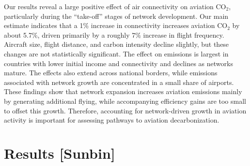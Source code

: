 \documentclass[12pt]{article}
\begin{document}
Our results reveal a large positive effect of air connectivity on
aviation CO$_2$, particularly during the ``take-off'' stages of network
development. Our main estimate indicates that a 1\% increase in
connectivity increases aviation CO$_2$ by about 5.7\%, driven primarily
by a roughly 7\% increase in flight frequency. Aircraft size, flight
distance, and carbon intensity decline slightly, but these changes are
not statistically significant. The effect on emissions is largest in
countries with lower initial income and connectivity and declines as
networks mature. The effects also extend across national borders, while
emissions associated with network growth are concentrated in a small
share of airports. These findings show that network expansion increases
aviation emissions mainly by generating additional flying, while
accompanying efficiency gains are too small to offset this growth.
Therefore, accounting for network-driven growth in aviation activity is
important for assessing pathways to aviation decarbonization.

\section*{Results [Sunbin]}
\end{document}
